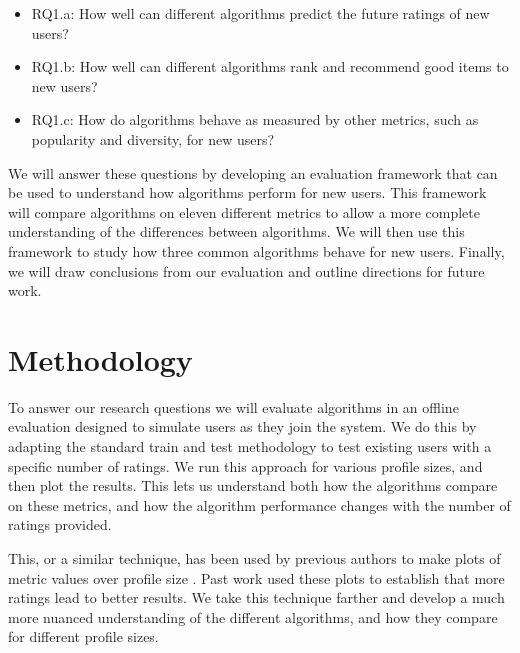 \documentclass[letterpaper]{sig-alternate}
\begin{document}
  \begin{itemize}
  \item RQ1.a: How well can different algorithms predict the future ratings of new users?
  \item RQ1.b: How well can different algorithms rank and recommend good items to new users?
  \item RQ1.c: How do algorithms behave as measured by other metrics, such as popularity and diversity, for new users?
  \end{itemize}

  We will answer these questions by developing an evaluation framework that can be used to understand how algorithms perform for new users.
  This framework will compare algorithms on eleven different metrics to allow a more complete understanding of the differences between algorithms.
  We will then use this framework to study how three common algorithms behave for new users.
  Finally, we will draw conclusions from our evaluation and outline directions for future work.

\section{Methodology}
\label{sec:methodology}

  To answer our research questions we will evaluate algorithms in an offline evaluation designed to simulate users as they join the system.
  We do this by adapting the standard train and test methodology to test existing users with a specific number of ratings.
  We run this approach for various profile sizes, and then plot the results.
  This lets us understand both how the algorithms compare on these metrics, and how the algorithm performance changes with the number of ratings provided.

  This, or a similar technique, has been used by previous authors to make plots of metric values over profile size \cite{DrennerInitialExperiance, TenIsEnough, AdaptiveBootstrap, LathiaTemporal}.
  Past work used these plots to establish that more ratings lead to better results.
  We take this technique farther and develop a much more nuanced understanding of the different algorithms, and how they compare for different profile sizes.
\end{document}
